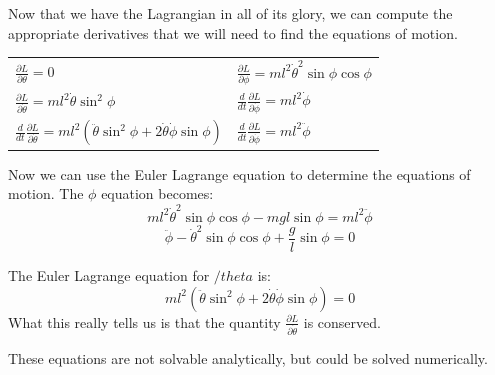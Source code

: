 \documentclass[10pt,a4paper]{article}
\begin{document}
Now that we have the Lagrangian in all of its glory, we can compute the appropriate derivatives that we will need to find the equations of motion.

\begin{table}[h]
\centering
\begin{tabular}{ll}
$\frac{\partial L}{\partial \theta}= 0$ &
$\frac{\partial L}{\partial \phi}=ml^2\dot{\theta}^2\sin\phi\cos\phi$\\
$\frac{\partial L}{\partial \dot{\theta}}=ml^2\dot{\theta} \sin^2\phi$ &
$\frac{d}{dt}\frac{\partial L}{\partial \dot{\phi}}=ml^2\dot{\phi}$\\
$\frac{d}{dt}\frac{\partial L}{\partial \dot{\theta}}=ml^2 \left(\ddot{\theta}\sin^2\phi+2\dot{\theta}\dot{\phi}\sin\phi\right)$&
$\frac{d}{dt}\frac{\partial L}{\partial \dot{\phi}}=ml^2\ddot{\phi}$\\
\end{tabular}
\end{table}

Now we can use the Euler Lagrange equation to determine the equations of motion.  The $\phi$ equation becomes:
\begin{equation}
ml^2\dot{\theta}^2 \sin\phi\cos\phi-mgl\sin\phi=ml^2\ddot{\phi}
\end{equation}
\begin{equation}
\ddot{\phi}-\dot{\theta}^2\sin\phi\cos\phi+\frac{g}{l}\sin\phi=0
\end{equation}

The Euler Lagrange equation for $/theta$ is:
\begin{equation}
ml^2 \left(\ddot{\theta}\sin^2\phi+2\dot{\theta}\dot{\phi}\sin\phi\right)=0
\end{equation}
What this really tells us is that the quantity $\frac{\partial L}{\partial\dot{\theta}}$ is conserved.

These equations are not solvable analytically, but could be solved numerically.
\end{document}
